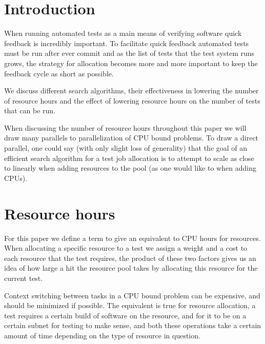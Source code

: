 \documentclass[twoside]{article}
\begin{document}
 \begin{multicols}{2}

\section{Introduction}

When running automated tests as a main means of verifying software quick
feedback is incredibly important. To facilitate quick feedback automated tests
must be run after ever commit and as the list of tests that the test system
runs grows, the strategy for allocation becomes more and more important to keep
the feedback cycle as short as possible.

We discuss different search algorithms, their effectiveness in lowering the
number of resource hours and the effect of lowering resource hours on the
number of tests that can be run.

When discussing the number of resource hours throughout this paper we will draw
many parallels to parallelization of CPU bound problems. To draw a direct
parallel, one could say (with only slight loss of generality) that the goal of
an efficient search algorithm for a test job allocation is to attempt to scale
as close to linearly when adding resources to the pool (as one would like to
when adding CPUs).



\section{Resource hours}

For this paper we define a term to give an equivalent to CPU hours for
resources. When allocating a specific resource to a test we assign a weight and
a cost to each resource that the test requires, the product of these two
factors gives us an idea of how large a hit the resource pool takes by
allocating this resource for the current test.

Context switching between tasks in a CPU bound problem can be expensive, and
should be minimized if possible. The equivalent is true for resource
allocation, a test requires a certain build of software on the resource, and
for it to be on a certain subnet for testing to make sense, and both these
operations take a certain amount of time depending on the type of resource in
question.



\end{multicols}
\end{document}
